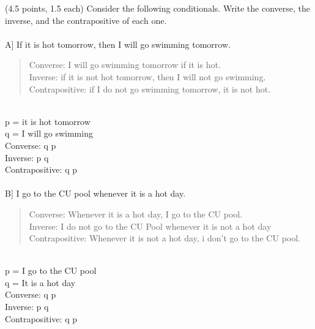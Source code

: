 \documentclass[9pt]{article}
\begin{document}
\vspace{10mm}
\newpage
\vspace{5mm}
\item (4.5 points, 1.5 each) Consider the following conditionals. Write the
converse, the inverse, and the contrapositive of each one.\\
\\
A] If it is hot tomorrow, then I will go swimming tomorrow.\\
	\begin{quote}
	Converse: I will go swimming tomorrow if it is hot. \\
	Inverse: if it is not hot tomorrow, then I will not go swimming.\\
	Contrapositive: if I do not go swimming tomorrow, it is not hot.\\
	\end{quote}
	\\
	
	p = it is hot tomorrow \\ q = I will go swimming \\
	Converse: q \to p\\
	Inverse: \lnot p \to \lnot q\\
	Contrapositive: \lnot q \to \lnot p\\
	
\\
B] I go to the CU pool whenever it is a hot day.\\
\begin{quote}
	Converse: Whenever it is a hot day, I go to the CU pool.\\
	Inverse: I do not go to the CU Pool whenever it is not a hot day \\
	Contrapositive: Whenever it is not a hot day, i don't go to the CU pool.\\
	\end{quote}
	\\
	p = I go to the CU pool \\ q = It is a hot day \\
	Converse: q \to p\\
	Inverse: \lnot p \to \lnot q\\
	Contrapositive: \lnot q \to \lnot p\\
	
\end{document}
